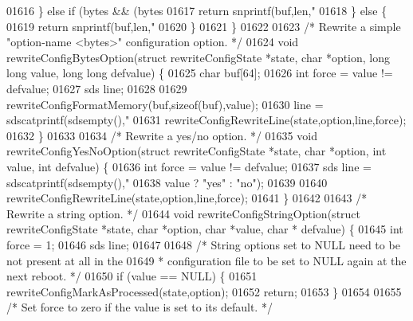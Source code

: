 \begin{DoxyCode}
{{{{{{{{{{{{{{{{01616     \} \textcolor{keywordflow}{else} \textcolor{keywordflow}{if} (bytes && (bytes %
01617         \textcolor{keywordflow}{return} snprintf(buf,len,\textcolor{stringliteral}{"%
01618     \} \textcolor{keywordflow}{else} \{
01619         \textcolor{keywordflow}{return} snprintf(buf,len,\textcolor{stringliteral}{"%
01620     \}
01621 \}
01622 
01623 \textcolor{comment}{/* Rewrite a simple "option-name <bytes>" configuration option. */}
01624 \textcolor{keywordtype}{void} rewriteConfigBytesOption(\textcolor{keyword}{struct} rewriteConfigState *state, \textcolor{keywordtype}{char} *option, \textcolor{keywordtype}{long} \textcolor{keywordtype}{long} value, \textcolor{keywordtype}{long} \textcolor{keywordtype}{
      long} defvalue) \{
01625     \textcolor{keywordtype}{char} buf[64];
01626     \textcolor{keywordtype}{int} force = value != defvalue;
01627     sds line;
01628 
01629     rewriteConfigFormatMemory(buf,\textcolor{keyword}{sizeof}(buf),value);
01630     line = sdscatprintf(sdsempty(),\textcolor{stringliteral}{"%
01631     rewriteConfigRewriteLine(state,option,line,force);
01632 \}
01633 
01634 \textcolor{comment}{/* Rewrite a yes/no option. */}
01635 \textcolor{keywordtype}{void} rewriteConfigYesNoOption(\textcolor{keyword}{struct} rewriteConfigState *state, \textcolor{keywordtype}{char} *option, \textcolor{keywordtype}{int} value, \textcolor{keywordtype}{int} defvalue)
       \{
01636     \textcolor{keywordtype}{int} force = value != defvalue;
01637     sds line = sdscatprintf(sdsempty(),\textcolor{stringliteral}{"%
01638         value ? \textcolor{stringliteral}{"yes"} : \textcolor{stringliteral}{"no"});
01639 
01640     rewriteConfigRewriteLine(state,option,line,force);
01641 \}
01642 
01643 \textcolor{comment}{/* Rewrite a string option. */}
01644 \textcolor{keywordtype}{void} rewriteConfigStringOption(\textcolor{keyword}{struct} rewriteConfigState *state, \textcolor{keywordtype}{char} *option, \textcolor{keywordtype}{char} *value, \textcolor{keywordtype}{char} *
      defvalue) \{
01645     \textcolor{keywordtype}{int} force = 1;
01646     sds line;
01647 
01648     \textcolor{comment}{/* String options set to NULL need to be not present at all in the}
01649 \textcolor{comment}{     * configuration file to be set to NULL again at the next reboot. */}
01650     \textcolor{keywordflow}{if} (value == NULL) \{
01651         rewriteConfigMarkAsProcessed(state,option);
01652         \textcolor{keywordflow}{return};
01653     \}
01654 
01655     \textcolor{comment}{/* Set force to zero if the value is set to its default. */}
}}}}}}}}}}}}}}}}}}}}
\end{DoxyCode}
